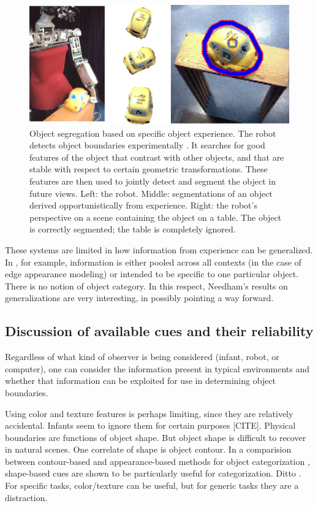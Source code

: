 \begin{figure}[t]

\centerline{
\includegraphics[width=0.75\columnwidth]{fig-robot}
}

\caption{
%
Object segregation based on specific object experience.  The robot
detects object boundaries experimentally \cite{fitzpatrick03object}.
It searches for good features of the object that contrast with other
objects, and that are stable with respect to certain geometric
transformations.  These features are then used to jointly detect
and segment the object in future views.  Left: the robot.
Middle: segmentations of an object derived opportunistically
from experience.  Right: the robot's perspective on a scene 
containing the object on a table.  The object is correctly segmented;
the table is completely ignored.
%
}

\label{fig:robot}

\end{figure}



These systems are limited in how information from experience can be
generalized.  In , for example,
information is either pooled across all contexts (in the case of edge
appearance modeling) or intended to be specific to one particular
object.  There is no notion of object category.
%
In this respect, Needham's results on generalizations are
very interesting, in possibly pointing a way forward.


\subsection{Discussion of available cues and their reliability}

Regardless of what kind of observer is being considered (infant,
robot, or computer), one can consider the information present
in typical environments and whether that information can be
exploited for use in determining object boundaries.

Using color and texture features is perhaps limiting, since they
are relatively accidental.  Infants seem to ignore them for
certain purposes [CITE].
%
Physical boundaries are functions of object shape.  But object shape
is difficult to recover in natural scenes.
%
One correlate of shape is object contour.  In a comparision between
contour-based and appearance-based methods for object categorization
\cite{leibe03analyzing}, shape-based cues are shown to be
particularly useful for categorization.
Ditto \cite{lecun04learning}.
For specific tasks, color/texture can be useful, but for 
generic tasks they are a distraction.

